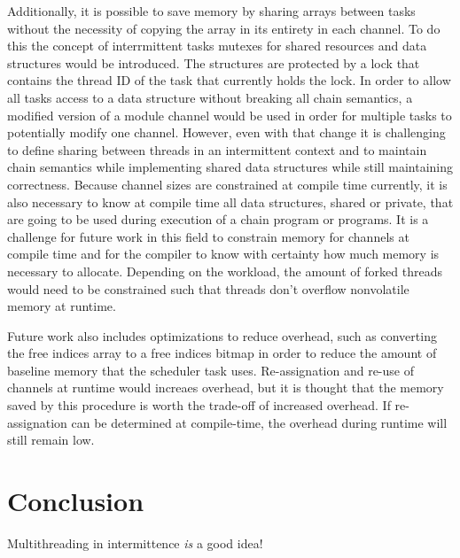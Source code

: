 \documentclass[11pt]{sensys-proc}
\begin{document}
Additionally, it is possible to save memory by sharing arrays between tasks without the necessity of copying the array in its entirety in each channel.
To do this the concept of interrmittent tasks mutexes for shared resources and data structures would be introduced.
The structures are protected by a lock that contains the thread ID of the task that currently holds the lock.
In order to allow all tasks access to a data structure without breaking all chain semantics, a modified version of a module channel would be used in order 
for multiple tasks to potentially modify one channel. 
However, even with that change it is challenging to define sharing between threads in an intermittent context and to maintain chain semantics while implementing 
shared data structures while still maintaining correctness. 
Because channel sizes are constrained at compile time currently, it is also necessary to know at compile time all data structures, shared or private, 
that are going to be used during execution of a chain program or programs. 
It is a challenge for future work in this field to constrain memory for channels at compile time and for the compiler to know with certainty how much memory 
is necessary to allocate. Depending on the workload, the amount of forked threads would need to be constrained such that threads don't overflow nonvolatile memory at runtime.

Future work also includes optimizations to reduce overhead, such as converting the free indices array to a free indices bitmap in order to reduce the amount of 
baseline memory that the scheduler task uses. 
Re-assignation and re-use of channels at runtime would increaes overhead, but it is thought that the memory saved by this procedure is worth the trade-off of increased overhead.
If re-assignation can be determined at compile-time, the overhead during runtime will still remain low.

\section{Conclusion}
Multithreading in intermittence {\em is} a good idea!


\balance

\end{document}
